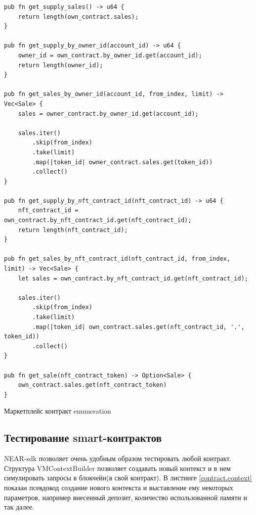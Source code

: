 \begin{listing}
\begin{verbatim}
pub fn get_supply_sales() -> u64 {
    return length(own_contract.sales);
}

pub fn get_supply_by_owner_id(account_id) -> u64 {
    owner_id = own_contract.by_owner_id.get(account_id);
    return length(owner_id);
}

pub fn get_sales_by_owner_id(account_id, from_index, limit) -> Vec<Sale> {
    sales = owner_contract.by_owner_id.get(account_id);

    sales.iter()
        .skip(from_index)
        .take(limit)
        .map(|token_id| owner_contract.sales.get(token_id))
        .collect()
}

pub fn get_supply_by_nft_contract_id(nft_contract_id) -> u64 {
    nft_contract_id = own_contract.by_nft_contract_id.get(nft_contract_id);
    return length(nft_contract_id);
}

pub fn get_sales_by_nft_contract_id(nft_contract_id, from_index, limit) -> Vec<Sale> {
    let sales = own_contract.by_nft_contract_id.get(nft_contract_id);

    sales.iter()
        .skip(from_index)
        .take(limit)
        .map(|token_id| own_contract.sales.get(nft_contract_id, '.', token_id))
        .collect()
}

pub fn get_sale(nft_contract_token) -> Option<Sale> {
    own_contract.sales.get(nft_contract_token)
}
\end{verbatim}
\caption{Маркетплейс контракт enumeration}
\label{marketplacecontract.enumeration}
\end{listing}

\subsection{Тестирование smart-контрактов}

NEAR-sdk позволяет очень удобным образом тестировать любой контракт. Структура VMContextBuilder позволяет создавать новый контекст и в нем симулировать запросы в блокчейн(в свой контракт).
В листинге {\color{blue}\ref{contract.context}} показан псевдокод создание нового контекста и выставление ему некоторых параметров, например внесенный депозит, количество использованной памяти и так далее.

